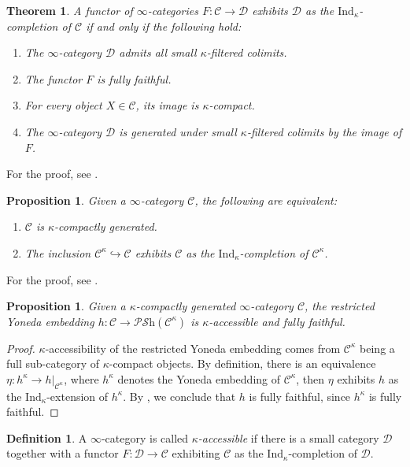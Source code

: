 \documentclass[a4paper]{book}
\newcommand{\lC}{\mathcal{C}}
\newcommand{\lD}{\mathcal{D}}
\newcommand{\lP}{\mathcal{P}}
\newcommand{\lS}{\mathcal{S}}
\newcommand{\Psh}{\lP\Shv} %
\newcommand{\Shv}{\lS\mathrm{h}} %
\newcommand{\Ind}{\mathrm{Ind}} %
\newtheorem{theorem}[equation]{Theorem}
\newtheorem{proposition}[equation]{Proposition}
\theoremstyle{definition}
\newtheorem{definition}[equation]{Definition}
\theoremstyle{remark}
\numberwithin{equation}{section}
\begin{document}
\begin{theorem}\label{thm:condind}
	A functor of $\infty$-categories $F:\lC\to\lD$ exhibits $\lD$ as the $\Ind_\kappa$-completion of $\lC$ if and only if the following hold: 
	\begin{enumerate}
		\item The $\infty$-category $\lD$ admits all small $\kappa$-filtered colimits. 
		\item The functor $F$ is fully faithful. 
		\item For every object $X\in\lC$, its image is $\kappa$-compact. 
		\item The $\infty$-category $\lD$ is generated under small $\kappa$-filtered colimits by the image of $F$. 
	\end{enumerate}
\end{theorem}For the proof, see \cite[Tag 0653]{kerodon2026}. 
\begin{proposition}
	Given a $\infty$-category $\lC$, the following are equivalent:
	\begin{enumerate}
		\item $\lC$ is $\kappa$-compactly generated. 
		\item The inclusion $\lC^\kappa\hookrightarrow\lC$ exhibits $\lC$ as the $\Ind_\kappa$-completion of $\lC^\kappa$. 
	\end{enumerate}
\end{proposition}
For the proof, see \cite[Tag 067B]{kerodon2026}. 
\begin{proposition}
	Given a $\kappa$-compactly generated $\infty$-category $\lC$, the restricted Yoneda embedding $h:\lC\to\Psh(\lC^\kappa)$ is $\kappa$-accessible and fully faithful. 
\end{proposition}
\begin{proof}
	$\kappa$-accessibility of the restricted Yoneda embedding comes from $\lC^\kappa$ being a full sub-category of $\kappa$-compact objects. By definition, there is an equivalence $\eta:h^\kappa\to h|_{\lC^\kappa}$, where $h^\kappa$ denotes the Yoneda embedding of $\lC^\kappa$, then $\eta$ exhibits $h$ as the $\Ind_\kappa$-extension of $h^\kappa$. By \cite[Tag 0651]{kerodon2026}, we conclude that $h$ is fully faithful, since $h^\kappa$ is fully faithful. 
\end{proof}
\begin{definition}
	A $\infty$-category is called \emph{$\kappa$-accessible} if there is a small category $\lD$ together with a functor $F:\lD\to\lC$ exhibiting $\lC$ as the $\Ind_\kappa$-completion of $\lD$.
\end{definition}
\end{document}
